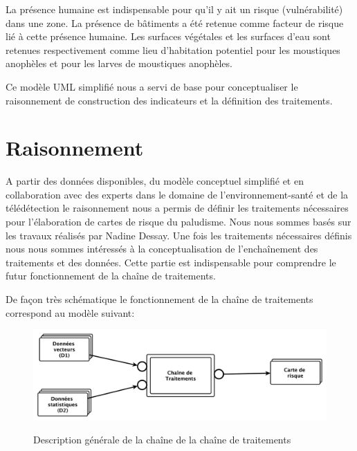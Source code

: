 La présence humaine est indispensable pour qu'il y ait un risque (vulnérabilité) dans une zone. La présence de bâtiments a été retenue comme facteur de risque lié à cette présence humaine. Les surfaces végétales et les surfaces d'eau sont retenues respectivement  comme lieu d'habitation potentiel pour les moustiques anophèles et pour les larves de moustiques anophèles.

Ce modèle UML simplifié nous a servi de base pour conceptualiser le raisonnement de construction des indicateurs et la définition des traitements.



\section{Raisonnement}

A partir des données disponibles, du modèle conceptuel simplifié et en collaboration avec des experts dans le domaine de l'environnement-santé et de la télédétection le raisonnement nous a permis de définir les traitements nécessaires pour l'élaboration de cartes de risque du paludisme. Nous nous sommes basés sur les travaux réalisés par Nadine Dessay. Une fois les traitements nécessaires définis nous nous sommes intéressés à la conceptualisation de l'enchaînement des traitements et des données. Cette partie est indispensable pour comprendre le futur fonctionnement de la chaîne de traitements.\\

\newpage

De façon très schématique le fonctionnement de la chaîne de traitements correspond au modèle suivant:\\


\begin{center}
\begin{figure}[h] \centering
\includegraphics[width=12cm]{Traitement1.png}\\
\caption{\label{Traitements1} Description générale de la chaîne de la chaîne de traitements}
\end{figure}
\end{center}

